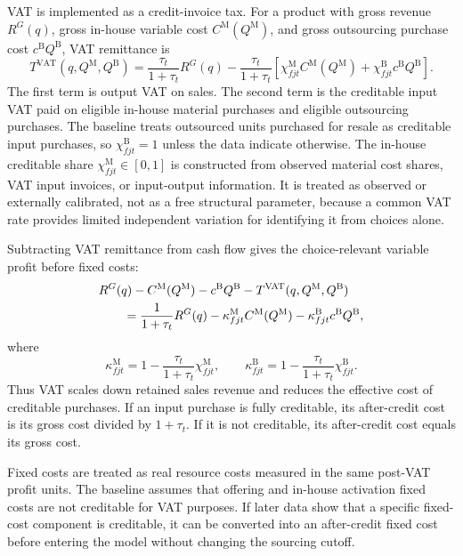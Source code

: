 \documentclass[11pt,a4paper]{article}
\newcommand{\M}{\mathrm{M}}
\newcommand{\B}{\mathrm{B}}
\newcommand{\VAT}{\mathrm{VAT}}
\begin{document}
VAT is implemented as a credit-invoice tax. For a product with gross revenue $R^G(q)$, gross in-house variable cost $C^{\M}(Q^{\M})$, and gross outsourcing purchase cost $c^{\B}Q^{\B}$, VAT remittance is
\begin{equation}
    T^{\VAT}(q,Q^{\M},Q^{\B})
    =\frac{\tau_t}{1+\tau_t}R^G(q)
    -\frac{\tau_t}{1+\tau_t}
    \left[\chi^{\M}_{fjt}C^{\M}(Q^{\M})+\chi^{\B}_{fjt}c^{\B}Q^{\B}\right].
    \label{eq:vat_liability}
\end{equation}
The first term is output VAT on sales. The second term is the creditable input VAT paid on eligible in-house material purchases and eligible outsourcing purchases. The baseline treats outsourced units purchased for resale as creditable input purchases, so $\chi^{\B}_{fjt}=1$ unless the data indicate otherwise. The in-house creditable share $\chi^{\M}_{fjt}\in[0,1]$ is constructed from observed material cost shares, VAT input invoices, or input-output information. It is treated as observed or externally calibrated, not as a free structural parameter, because a common VAT rate provides limited independent variation for identifying it from choices alone.

Subtracting VAT remittance from cash flow gives the choice-relevant variable profit before fixed costs:
\begin{align}
    &R^G(q)-C^{\M}(Q^{\M})-c^{\B}Q^{\B}-T^{\VAT}(q,Q^{\M},Q^{\B}) \notag\\
    &\qquad =\frac{1}{1+\tau_t}R^G(q)
    -\kappa^{\M}_{fjt}C^{\M}(Q^{\M})
    -\kappa^{\B}_{fjt}c^{\B}Q^{\B},
    \label{eq:profit_after_vat}
\end{align}
where
\begin{equation}
    \kappa^{\M}_{fjt}=1-\frac{\tau_t}{1+\tau_t}\chi^{\M}_{fjt},
    \qquad
    \kappa^{\B}_{fjt}=1-\frac{\tau_t}{1+\tau_t}\chi^{\B}_{fjt}.
    \label{eq:kappa_def}
\end{equation}
Thus VAT scales down retained sales revenue and reduces the effective cost of creditable purchases. If an input purchase is fully creditable, its after-credit cost is its gross cost divided by $1+\tau_t$. If it is not creditable, its after-credit cost equals its gross cost.

Fixed costs are treated as real resource costs measured in the same post-VAT profit units. The baseline assumes that offering and in-house activation fixed costs are not creditable for VAT purposes. If later data show that a specific fixed-cost component is creditable, it can be converted into an after-credit fixed cost before entering the model without changing the sourcing cutoff.
\end{document}
